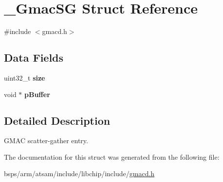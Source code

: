\hypertarget{struct__GmacSG}{}\section{\+\_\+\+Gmac\+SG Struct Reference}
\label{struct__GmacSG}


{\ttfamily \#include $<$gmacd.\+h$>$}

\subsection*{Data Fields}
\begin{DoxyCompactItemize}
\item 
\mbox{\label{struct__GmacSG_ad49308b5b4723d4b87368272e2e82c21}} 
uint32\+\_\+t {\bfseries size}
\item 
\mbox{\label{struct__GmacSG_a0257a68cb63efaf30dfe1c81ef611a35}} 
void $\ast$ {\bfseries p\+Buffer}
\end{DoxyCompactItemize}


\subsection{Detailed Description}
G\+M\+AC scatter-\/gather entry. 

The documentation for this struct was generated from the following file\+:\begin{DoxyCompactItemize}
\item 
bsps/arm/atsam/include/libchip/include/\mbox{\hyperlink{gmacd_8h}{gmacd.\+h}}\end{DoxyCompactItemize}
